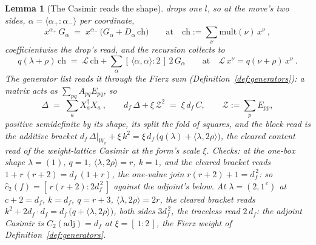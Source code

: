 \documentclass[11pt]{article}
\newtheorem{lemma}{Lemma}
\theoremstyle{definition}
\begin{document}
\begin{lemma}[The Casimir reads the shape]
drops one $l$, so at the move's two sides,
$\alpha=\langle\alpha_+\!:\!\alpha_-\rangle$ per coordinate,
\[
x^{\alpha_+}\,G_\alpha\;=\;x^{\alpha_-}\,
\big(G_\alpha+D_\alpha\,\mathrm{ch}\big)
\qquad\text{at}\quad
\mathrm{ch}:=\sum_\nu\mathrm{mult}(\nu)\,x^\nu\ ,
\]
coefficientwise the drop's read, and the recursion collects to
\[
q(\lambda{+}\rho)\,\mathrm{ch}
\;=\;\mathcal L\,\mathrm{ch}
+\sum_\alpha[\,\langle\alpha,\alpha\rangle:2\,]\,2\,G_\alpha
\qquad\text{at}\quad
\mathcal L\,x^\nu=q(\nu{+}\rho)\,x^\nu\ .
\]
The generator list reads it through the Fierz sum
(Definition~\ref{def:generators}): a matrix acts as
$\sum_{pq}A_{pq}E_{pq}$, so
\[
\Delta\;=\;\sum_aX_a^{\dagger}X_a\ ,
\qquad
d_f\,\Delta+\xi\,\mathcal Z^2\;=\;\xi\,d_f\,C ,
\qquad \mathcal Z:=\sum_pE_{pp} ,
\]
positive semidefinite by its shape, its split the fold of squares, and the block read is the additive bracket
$d_f\,\Delta|_{W_v}+\xi\,k^2=\xi\,d_f\,\big(q(\lambda)+\langle\lambda,2\rho\rangle\big)$,
the cleared content read of the weight-lattice Casimir at the form's scale $\xi$.
Checks: at the one-box shape $\lambda=(1)$, $q=1$,
$\langle\lambda,2\rho\rangle=r$, $k=1$, and the cleared bracket reads
$1+r\,(r+2)=d_f\,(1+r)$, the one-value join $r(r+2)+1=d_f^{\,2}$: so
$\hat c_2(f)=[\,r(r+2):2d_f^{\,2}\,]$ against the adjoint's
below. At $\lambda=(2,1^{\,c})$ at $c+2=d_f$, $k=d_f$, $q=r+3$,
$\langle\lambda,2\rho\rangle=2r$, the cleared bracket reads
$k^2+2d_f\cdot d_f=d_f\,\big(q+\langle\lambda,2\rho\rangle\big)$,
both sides $3d_f^{\,2}$, the traceless read $2\,d_f$: the adjoint
Casimir is $C_2(\mathrm{adj})=d_f$ at
$\xi=[\,1:2\,]$, the Fierz weight of Definition~\ref{def:generators}.
\end{lemma}
\end{document}
